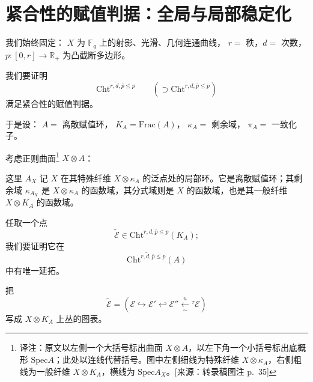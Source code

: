 \section{紧合性的赋值判据：全局与局部稳定化}

我们始终固定：
$X$ 为 $\mathbb{F}_{q}$ 上的射影、光滑、几何连通曲线，
$r=$ 秩，$d=$ 次数，$p:[0,r]\to\mathbb{R}_{+}$ 为凸截断多边形。

我们要证明
\[
\overline{\mathrm{Cht}^{r,d,\bar{p}\le p}}\qquad(\supset\mathrm{Cht}^{r,d,\bar{p}\le p})
\]
满足紧合性的赋值判据。

于是设：
$A=$ 离散赋值环，
$K_{A}=\mathrm{Frac}(A)$，
$\kappa_{A}=$ 剩余域，
$\pi_{A}=$ 一致化子。

考虑正则曲面\footnote{译注：原文以左侧一个大括号标出曲面 $X\otimes A$，以左下角一个小括号标出底概形 $\mathrm{Spec}A$；此处以连线代替括号。图中左侧细线为特殊纤维 $X\otimes\kappa_{A}$，右侧粗线为一般纤维 $X\otimes K_{A}$，横线为 $\mathrm{Spec}A_{X}$。[来源：转录稿图注 p.~35]} $X\otimes A$：
\begin{center}
\end{center}

这里 $A_{X}$ 记 $X$ 在其特殊纤维 $X\otimes\kappa_{A}$ 的泛点处的局部环。它是离散赋值环；其剩余域 $\kappa_{A_{X}}$ 是 $X\otimes\kappa_{A}$ 的函数域，其分式域则是 $X$ 的函数域，也是其一般纤维 $X\otimes K_{A}$ 的函数域。

任取一个点
\[
\tilde{\mathcal{E}}\in\mathrm{Cht}^{r,d,\bar{p}\le p}(K_{A});
\]
我们要证明它在
\[
\overline{\mathrm{Cht}^{r,d,\bar{p}\le p}}(A)
\]
中有唯一延拓。

把
\[
\tilde{\mathcal{E}}=(\mathcal{E}\hookrightarrow\mathcal{E}'\hookleftarrow\mathcal{E}''\xleftarrow[\sim]{u}{}^{\tau}\mathcal{E})
\]
写成 $X\otimes K_{A}$ 上丛的图表。

